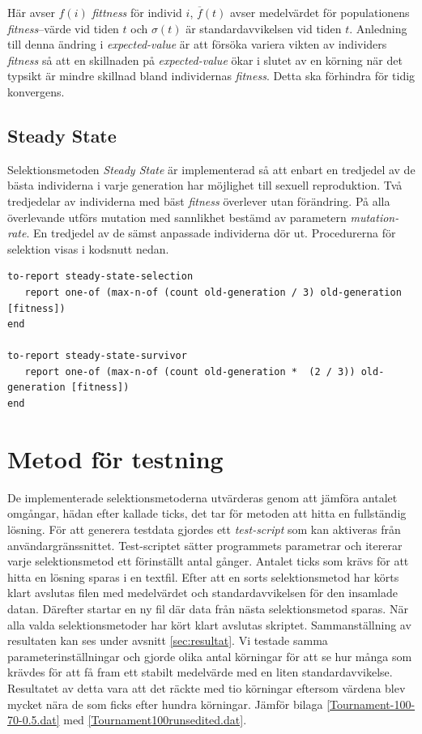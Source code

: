 \documentclass[titlepage, a4paper, 12pt]{article}
\begin{document}
Här avser $f(i)$ \textit{fittness} för individ $i$, $\overline{f}(t)$
avser medelvärdet för populationens \textit{fitness}–värde vid tiden
$t$ och $\sigma(t)$ är standardavvikelsen vid tiden $t$. Anledning
till denna ändring i \textit{expected-value} är att försöka variera
vikten av individers \textit{fitness} så att en skillnaden på
\textit{expected-value} ökar i slutet av en körning när det typsikt är
mindre skillnad bland individernas \textit{fitness}. Detta ska
förhindra för tidig konvergens.

\subsection{Steady State}
Selektionsmetoden \textit{Steady State} är implementerad så att enbart
en tredjedel av de bästa individerna i varje generation har möjlighet
till sexuell reproduktion. Två tredjedelar av individerna med bäst
\textit{fitness} överlever utan förändring. På alla överlevande utförs
mutation med sannlikhet bestämd av parametern
\textit{mutation-rate}. En tredjedel av de sämst anpassade individerna
dör ut. Procedurerna för selektion visas i kodsnutt nedan.

\begin{kod}[H]
  \begin{scriptsize}
\begin{verbatim}
to-report steady-state-selection
   report one-of (max-n-of (count old-generation / 3) old-generation [fitness])
end

to-report steady-state-survivor
   report one-of (max-n-of (count old-generation *  (2 / 3)) old-generation [fitness])
end
\end{verbatim}
  \end{scriptsize}
\end{kod}

\section{Metod för testning}
De implementerade selektionsmetoderna utvärderas genom att jämföra
antalet omgångar, hädan efter kallade ticks, det tar för metoden att
hitta en fullständig lösning. För att generera testdata gjordes ett
\textit{test-script} som kan aktiveras från
användargränssnittet. Test-scriptet sätter programmets parametrar och
itererar varje selektionsmetod ett förinställt antal gånger. Antalet
ticks som krävs för att hitta en lösning sparas i en textfil. Efter
att en sorts selektionsmetod har körts klart avslutas filen med
medelvärdet och standardavvikelsen för den insamlade datan. Därefter
startar en ny fil där data från nästa selektionsmetod sparas. När alla
valda selektionsmetoder har kört klart avslutas
skriptet. Sammanställning av resultaten kan ses under avsnitt
\ref{sec:resultat}. Vi testade samma parameterinställningar och gjorde
olika antal körningar för att se hur många som krävdes för att få fram
ett stabilt medelvärde med en liten standardavvikelse. Resultatet av
detta vara att det räckte med tio körningar eftersom värdena blev
mycket nära de som ficks efter hundra körningar. Jämför bilaga
\ref{Tournament-100-70-0.5.dat} med
\ref{Tournament100runsedited.dat}.
\end{document}
